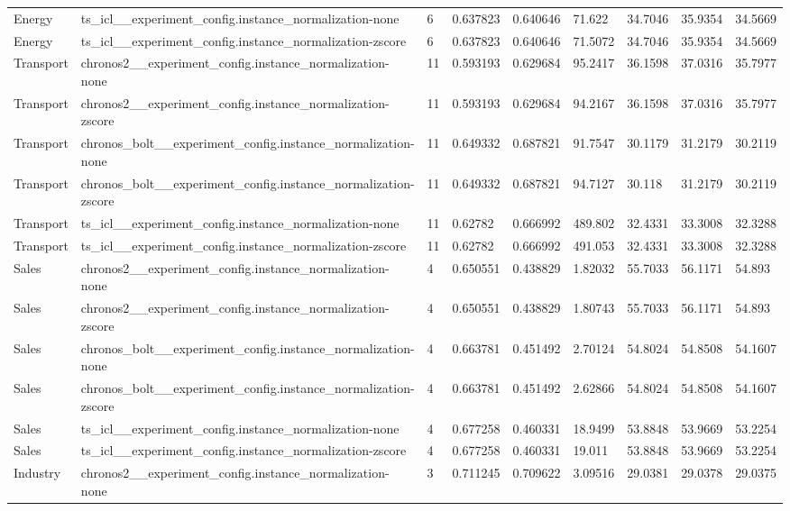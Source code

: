 \begin{tabular}{lllllllll}
Energy & ts\_icl\_\_experiment\_config.instance\_normalization-none & 6 & 0.637823 & 0.640646 & 71.622 & 34.7046 & 35.9354 & 34.5669 \\
Energy & ts\_icl\_\_experiment\_config.instance\_normalization-zscore & 6 & 0.637823 & 0.640646 & 71.5072 & 34.7046 & 35.9354 & 34.5669 \\
Transport & chronos2\_\_experiment\_config.instance\_normalization-none & 11 & 0.593193 & 0.629684 & 95.2417 & 36.1598 & 37.0316 & 35.7977 \\
Transport & chronos2\_\_experiment\_config.instance\_normalization-zscore & 11 & 0.593193 & 0.629684 & 94.2167 & 36.1598 & 37.0316 & 35.7977 \\
Transport & chronos\_bolt\_\_experiment\_config.instance\_normalization-none & 11 & 0.649332 & 0.687821 & 91.7547 & 30.1179 & 31.2179 & 30.2119 \\
Transport & chronos\_bolt\_\_experiment\_config.instance\_normalization-zscore & 11 & 0.649332 & 0.687821 & 94.7127 & 30.118 & 31.2179 & 30.2119 \\
Transport & ts\_icl\_\_experiment\_config.instance\_normalization-none & 11 & 0.62782 & 0.666992 & 489.802 & 32.4331 & 33.3008 & 32.3288 \\
Transport & ts\_icl\_\_experiment\_config.instance\_normalization-zscore & 11 & 0.62782 & 0.666992 & 491.053 & 32.4331 & 33.3008 & 32.3288 \\
Sales & chronos2\_\_experiment\_config.instance\_normalization-none & 4 & 0.650551 & 0.438829 & 1.82032 & 55.7033 & 56.1171 & 54.893 \\
Sales & chronos2\_\_experiment\_config.instance\_normalization-zscore & 4 & 0.650551 & 0.438829 & 1.80743 & 55.7033 & 56.1171 & 54.893 \\
Sales & chronos\_bolt\_\_experiment\_config.instance\_normalization-none & 4 & 0.663781 & 0.451492 & 2.70124 & 54.8024 & 54.8508 & 54.1607 \\
Sales & chronos\_bolt\_\_experiment\_config.instance\_normalization-zscore & 4 & 0.663781 & 0.451492 & 2.62866 & 54.8024 & 54.8508 & 54.1607 \\
Sales & ts\_icl\_\_experiment\_config.instance\_normalization-none & 4 & 0.677258 & 0.460331 & 18.9499 & 53.8848 & 53.9669 & 53.2254 \\
Sales & ts\_icl\_\_experiment\_config.instance\_normalization-zscore & 4 & 0.677258 & 0.460331 & 19.011 & 53.8848 & 53.9669 & 53.2254 \\
Industry & chronos2\_\_experiment\_config.instance\_normalization-none & 3 & 0.711245 & 0.709622 & 3.09516 & 29.0381 & 29.0378 & 29.0375 \\

\end{tabular}
